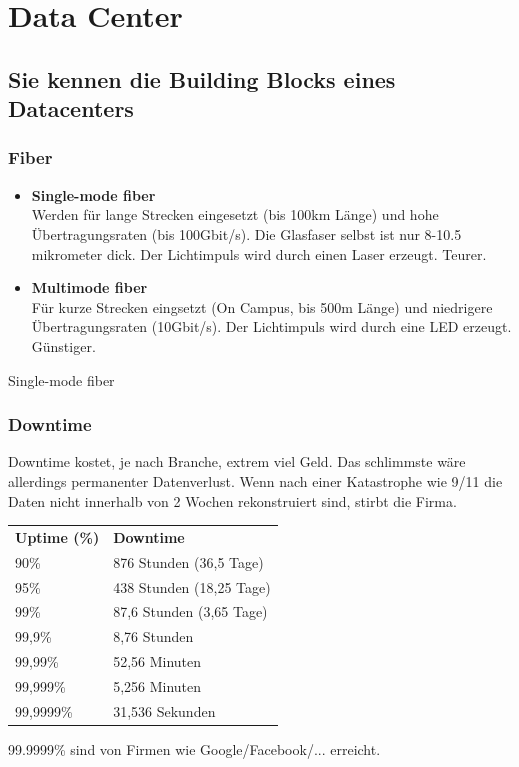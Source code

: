 \chapter{Data Center}
\section{Sie kennen die Building Blocks eines Datacenters}
\subsection{Fiber}
\begin{itemize}
	\item \textbf{Single-mode fiber}\\
		Werden für lange Strecken eingesetzt (bis 100km Länge) und hohe Übertragungsraten (bis 100Gbit/s). Die Glasfaser selbst ist nur 8-10.5 mikrometer dick. Der Lichtimpuls wird durch einen Laser erzeugt. Teurer.
	\item \textbf{Multimode fiber}\\
	Für kurze Strecken eingsetzt (On Campus, bis 500m Länge) und niedrigere Übertragungsraten (10Gbit/s). Der Lichtimpuls wird durch eine LED erzeugt. Günstiger.
\end{itemize}
Single-mode fiber
\subsection{Downtime}
Downtime kostet, je nach Branche, extrem viel Geld. Das schlimmste wäre allerdings permanenter Datenverlust. Wenn nach einer Katastrophe wie 9/11 die Daten nicht innerhalb von 2 Wochen rekonstruiert sind, stirbt die Firma.
\begin{table}[h]
	\begin{tabular}{ll}
		\textbf{Uptime (\%)} & \textbf{Downtime}        \\
		90\%                 & 876 Stunden (36,5 Tage)  \\
		95\%                 & 438 Stunden (18,25 Tage) \\
		99\%                 & 87,6 Stunden (3,65 Tage) \\
		99,9\%               & 8,76 Stunden             \\
		99,99\%              & 52,56 Minuten            \\
		99,999\%             & 5,256 Minuten            \\
		99,9999\%            & 31,536 Sekunden         
		\end{tabular}
		\end{table}
		99.9999\% sind von Firmen wie Google/Facebook/... erreicht.
